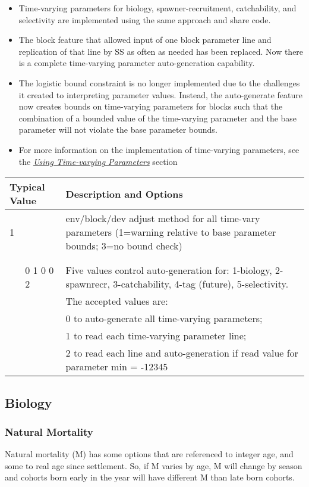 \begin{itemize}
  \item	Time-varying parameters for biology, spawner-recruitment, catchability, and selectivity are implemented using the same approach and share code.
  \item The block feature that allowed input of one block parameter line and replication of that line by SS as often as needed has been replaced.  Now there is a complete time-varying parameter auto-generation capability.
  \item The logistic bound constraint is no longer implemented due to the challenges it created to interpreting parameter values.  Instead, the auto-generate feature now creates bounds on time-varying parameters for blocks such that the combination of a bounded  value of the time-varying parameter and the base parameter will not violate the base parameter bounds.
  \item For more information on the implementation of time-varying parameters, see the \hyperref[time-vary]{\textit{Using Time-varying Parameters}} section
\end{itemize}	
	

\begin{longtable}{p{0.5cm} p{2cm} p{12cm}}
     \multicolumn{2}{l}{Typical Value} & Description and Options\\
     \hline
	 1 & & \multirow{1}{6cm}[-0.1cm]{\parbox{12cm}{env/block/dev adjust method for all time-vary parameters (1=warning relative to base parameter bounds; 3=no bound check)}}
	\\ \\ \\
	& 0 1 0 0 2 & Five values control auto-generation for:  1-biology, 2-spawnrecr, 3-catchability, 4-tag (future), 5-selectivity.\\
	&			& The accepted values are:\\
	&           & 0 to auto-generate all time-varying parameters;\\
	& 			& 1 to read each time-varying parameter line;\\
	&			& 2 to read each line and auto-generation if read value for parameter min = -12345 \\
	\hline
\end{longtable}


\subsection{Biology}
\subsubsection{Natural Mortality}
Natural mortality (M) has some options that are referenced to integer age, and some to real age since settlement.  So, if M varies by age, M will change by season and cohorts born  early in the year will have different M than late born cohorts.

